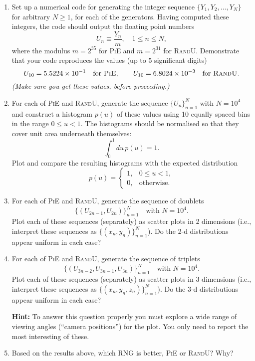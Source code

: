 \documentclass[12pt]{article}
\begin{document}
\begin{enumerate}
    \item Set up a numerical code for generating the integer sequence $\{Y_1, Y_2, \ldots, Y_N\}$ for arbitrary $N \geq 1$, for each of the generators. Having computed these integers, the code should output the floating point numbers
    \[
    U_n \equiv \frac{Y_n}{m}, \quad 1 \leq n \leq N,
    \]
    where the modulus $m = 2^{35}$ for \textsc{PiE} and $m = 2^{31}$ for \textsc{RandU}. Demonstrate that your code reproduces the values (up to 5 significant digits)
    \[
    U_{10} = 5.5224 \times 10^{-1} \quad \text{for}~\textsc{PiE}, \qquad U_{10} = 6.8024 \times 10^{-3} \quad \text{for}~\textsc{RandU}.
    \]
    \textit{(Make sure you get these values, before proceeding.)}

    \item For each of \textsc{PiE} and \textsc{RandU}, generate the sequence $\{U_n\}_{n=1}^N$ with $N = 10^4$ and construct a histogram $p(u)$ of these values using 10 equally spaced bins in the range $0 \leq u < 1$. The histograms should be normalised so that they cover unit area underneath themselves:
    \[
    \int_0^1 du \, p(u) = 1.
    \]
    Plot and compare the resulting histograms with the expected distribution
    \[
    p(u) = \begin{cases}
        1, & 0 \leq u < 1, \\
        0, & \text{otherwise}.
    \end{cases}
    \]

    \item For each of \textsc{PiE} and \textsc{RandU}, generate the sequence of doublets
    \[
    \{(U_{2n-1}, U_{2n})\}_{n=1}^N \quad \text{with } N = 10^4.
    \]
    Plot each of these sequences (separately) as scatter plots in 2 dimensions (i.e., interpret these sequences as $\{(x_n, y_n)\}_{n=1}^N$). Do the 2-d distributions appear uniform in each case?

    \item For each of \textsc{PiE} and \textsc{RandU}, generate the sequence of triplets
    \[
    \{(U_{3n-2}, U_{3n-1}, U_{3n})\}_{n=1}^N \quad \text{with } N = 10^4.
    \]
    Plot each of these sequences (separately) as scatter plots in 3 dimensions (i.e., interpret these sequences as $\{(x_n, y_n, z_n)\}_{n=1}^N$). Do the 3-d distributions appear uniform in each case?

    \textbf{Hint:} To answer this question properly you must explore a wide range of viewing angles (``camera positions'') for the plot. You only need to report the most interesting of these.

    \item Based on the results above, which RNG is better, \textsc{PiE} or \textsc{RandU}? Why?
\end{enumerate}
\end{document}
